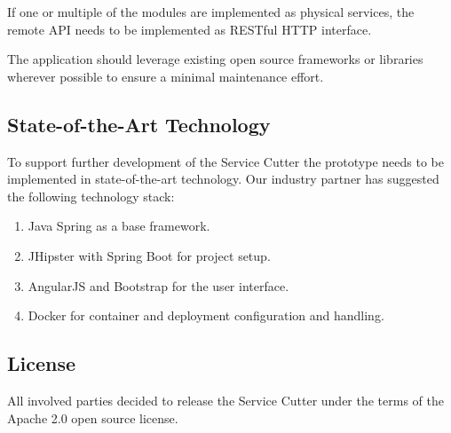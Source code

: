 If one or multiple of the modules are implemented as physical services, the remote \gls{API} needs to be implemented as RESTful HTTP interface. 

The application should leverage existing open source frameworks or libraries wherever possible to ensure a minimal maintenance effort.

\subsection{State-of-the-Art Technology}

To support further development of the Service Cutter the prototype needs to be implemented in state-of-the-art technology. Our industry partner has suggested the following technology stack:

\begin{enumerate}
	\item Java Spring\cite{spring} as a base framework. 
	\item JHipster\cite{jhipster} with Spring Boot\cite{springboot} for project setup.
	\item AngularJS\cite{angularjs} and Bootstrap\cite{bootstrap} for the user interface.
	\item Docker\cite{docker} for container and deployment configuration and handling. 
\end{enumerate}

\subsection{License}

All involved parties decided to release the Service Cutter under the terms of the Apache 2.0 open source license.